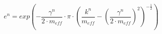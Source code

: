 \begin{equation}
\label{eq:cor}
e^n = exp \left(-\frac{\gamma^n}{2\cdot m_{eff}} \cdot \pi \cdot
\left(\frac{k^n}{m_{eff}}- \left(\frac{\gamma^n}{2\cdot m_{eff}} \right)^2
\right)^{-\frac{1}{2}} \right)
\end{equation}
